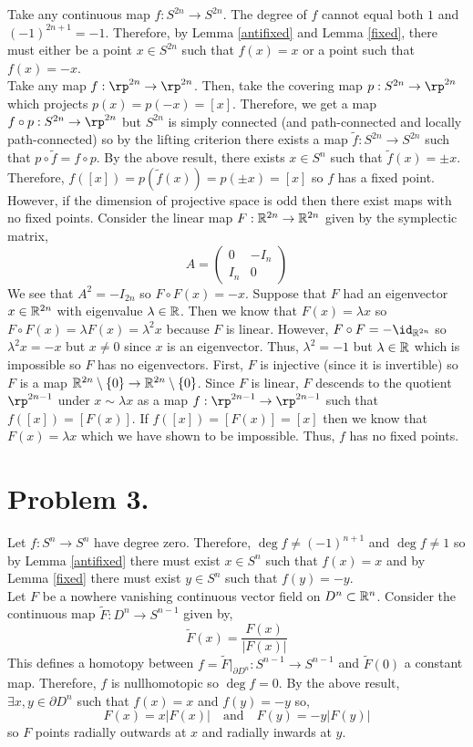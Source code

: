 \documentclass[12pt]{extarticle}
\begin{document}
Take any continuous map $f : S^{2n} \to S^{2n}$. The degree of $f$ cannot equal both $1$ and $(-1)^{2n+1} = -1$. Therefore, by Lemma \ref{antifixed} and Lemma \ref{fixed}, there must either be a point $x \in S^{2n}$ such that $f(x) = x$ or a point such that $f(x) = -x$. 
\bigskip\\
Take any map $f : \rp^{2n} \to \rp^{2n}$. Then, take the covering map $p : S^{2n} \to \rp^{2n}$ which projects $p(x) = p(-x) = [x]$. Therefore, we get a map $f \circ p : S^{2n} \to \rp^{2n}$ but $S^{2n}$ is simply connected (and path-connected and locally path-connected) so by the lifting criterion there exists a map $\tilde{f} : S^{2n} \to S^{2n}$ such that $p \circ \tilde{f} = f \circ p$. By the above result, there exists $x \in S^n$ such that $\tilde{f}(x) = \pm x$. Therefore, $f([x]) = p(\tilde{f}(x)) = p(\pm x) = [x]$ so $f$ has a fixed point. 
\bigskip
However, if the dimension of projective space is odd then there exist maps with no fixed points. Consider the linear map $F : \mathbb{R}^{2n} \to \mathbb{R}^{2n}$ given by the symplectic matrix,
\[ 
A = 
\begin{pmatrix}
0 & -I_{n} \\
I_{n} & 0 
\end{pmatrix}
\] 
We see that $A^2 = - I_{2n}$ so $F \circ F(x) = -x$. Suppose that $F$ had an eigenvector $x \in \mathbb{R}^{2n}$ with eigenvalue $\lambda \in \mathbb{R}$. Then we know that $F(x) = \lambda x$ so $F \circ F(x) = \lambda F(x) = \lambda^2 x$ because $F$ is linear. However, $F \circ F = - \id_{\R^{2n}}$ so $\lambda^2 x = - x$ but $x \neq 0$ since $x$ is an eigenvector. Thus, $\lambda^2 = -1$ but $\lambda \in \mathbb{R}$ which is impossible so $F$ has no eigenvectors. First, $F$ is injective (since it is invertible) so $F$ is a map $\mathbb{R}^{2n} \setminus \{0\} \to \mathbb{R}^{2n} \setminus \{0\}$. Since $F$ is linear, $F$ descends to the quotient $\rp^{2n - 1}$ under $x \sim \lambda x$ as a map $f : \rp^{2n - 1} \to \rp^{2n - 1}$ such that $f([x]) = [F(x)]$. If $f([x]) = [F(x)] = [x]$ then we know that $F(x) = \lambda x$ which we have shown to be impossible. Thus, $f$ has no fixed points. 

\section*{Problem 3.}

Let $f : S^n \to S^n$ have degree zero. Therefore, $\deg{f} \neq (-1)^{n+1}$ and $\deg{f} \neq 1$ so by Lemma \ref{antifixed} there must exist $x \in S^n$ such that $f(x) = x$ and by Lemma \ref{fixed} there must exist $y \in S^n$ such that $f(y) = -y$. 
\bigskip\\
Let $F$ be a nowhere vanishing continuous vector field on $D^n \subset \mathbb{R}^n$. Consider the continuous map $\tilde{F} : D^n \to S^{n-1}$ given by,
\[ \tilde{F}(x) = \frac{F(x)}{|F(x)|} \]
This defines a homotopy between $f = \tilde{F} |_{\partial D^n} : S^{n-1} \to S^{n-1}$ and $\tilde{F}(0)$ a constant map. Therefore, $f$ is nullhomotopic so $\deg{f} = 0$. By the above result, $\exists x,y \in \partial D^n$ such that $f(x) = x$ and $f(y) = -y$ so,
\[ F(x) = x |F(x)| \quad \text{and} \quad F(y) = - y |F(y)| \]
so $F$ points radially outwards at $x$ and radially inwards at $y$.   
\end{document}
